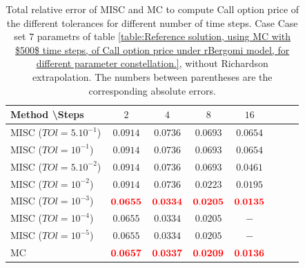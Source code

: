 \documentclass[11pt]{article}
\begin{document}
%
%
%
\begin{table}[h!]
	\centering
	\begin{tabular}{l*{6}{c}r}
		Method \textbackslash  Steps            & $2$ & $4$ & $8$ & $16$  \\
		\hline
		MISC ($TOl=5.10^{-1}$)  & $\mathbf{0.0914}$ & $\mathbf{0.0736}$ & $\mathbf{ 0.0693}$ & $\mathbf{ 0.0654}$  \\
		MISC ($TOl=10^{-1}$)  & $\mathbf{0.0914}$ & $\mathbf{0.0736}$& $\mathbf{ 0.0693}$ & $\mathbf{ 0.0654}$   \\
		MISC ($TOl=5.10^{-2}$)  & $\mathbf{0.0914}$ & $\mathbf{0.0736}$ & $\mathbf{ 0.0693}$ & $\mathbf{ 0.0461}$  \\
		MISC ($TOl=10^{-2}$)  &  $\mathbf{0.0914}$& $\mathbf{0.0736}$& $\mathbf{ 0.0223}$ & $\mathbf{ 0.0195}$  \\
		MISC ($TOl=10^{-3}$)  &  $\mathbf{{\color{red}0.0655}}$& $\mathbf{{\color{red}0.0334}}$& $\mathbf{{\color{red}0.0205}}$  & $\mathbf{ {\color{red}0.0135}}$  \\
		MISC ($TOl=10^{-4}$)  &  $\mathbf{0.0655}$& $\mathbf{0.0334}$& $\mathbf{0.0205}$ & $\mathbf{ -}$ \\
		MISC ($TOl=10^{-5}$)  &  $\mathbf{0.0655}$ & $\mathbf{0.0334}$& $\mathbf{0.0205}$ & $\mathbf{ -}$ 
		\\
		\hline
		MC    & $\mathbf{{\color{red}0.0657}}$  & $\mathbf{ {\color{red}0.0337}}$  & $\mathbf{{\color{red}0.0209}}$ & $\mathbf{ {\color{red}0.0136}}$  \\		
		\hline
	\end{tabular}
	\caption{Total relative error of MISC and MC to compute Call option price of the different tolerances for different number of time steps. Case Case set $7$ parametrs of table \ref{table:Reference solution, using MC with $500$ time steps, of Call option price under rBergomi model, for different parameter constellation.}, without Richardson extrapolation. The numbers between parentheses are the corresponding absolute errors.}
	\label{Total error of MISC and MC to compute Call option price of the different tolerances for different number of time steps. Case set 7, without Richardson extrapolation. The numbers between parentheses are the corresponding absolute errors.}
\end{table}
\end{document}
